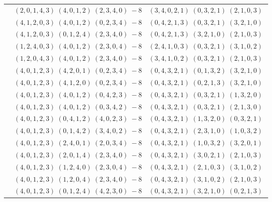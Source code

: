 \documentclass[11pt]{article}
\begin{document}
\begin{longtable}[l]{|c|c|c|}
 \cline{2-3} 
 & $(2 ,0 ,1 ,4 ,3) \;(4 ,0 ,1 ,2) \;(2 ,3 ,4 ,0) \;-8$ & $(3 ,4 ,0 ,2 ,1) \;(0 ,3 ,2 ,1) \;(2 ,1 ,0 ,3) \;$\\ 
 \cline{2-3} 
 & $(4 ,1 ,2 ,0 ,3) \;(4 ,0 ,1 ,2) \;(0 ,2 ,3 ,4) \;-8$ & $(0 ,4 ,2 ,1 ,3) \;(0 ,3 ,2 ,1) \;(3 ,2 ,1 ,0) \;$\\ 
 \cline{2-3} 
 & $(4 ,1 ,2 ,0 ,3) \;(0 ,1 ,2 ,4) \;(2 ,3 ,4 ,0) \;-8$ & $(0 ,4 ,2 ,1 ,3) \;(3 ,2 ,1 ,0) \;(2 ,1 ,0 ,3) \;$\\ 
 \cline{2-3} 
 & $(1 ,2 ,4 ,0 ,3) \;(4 ,0 ,1 ,2) \;(2 ,3 ,0 ,4) \;-8$ & $(2 ,4 ,1 ,0 ,3) \;(0 ,3 ,2 ,1) \;(3 ,1 ,0 ,2) \;$\\ 
 \cline{2-3} 
 & $(1 ,2 ,0 ,4 ,3) \;(4 ,0 ,1 ,2) \;(2 ,3 ,4 ,0) \;-8$ & $(3 ,4 ,1 ,0 ,2) \;(0 ,3 ,2 ,1) \;(2 ,1 ,0 ,3) \;$\\ 
 \cline{2-3} 
 & $(4 ,0 ,1 ,2 ,3) \;(4 ,2 ,0 ,1) \;(0 ,2 ,3 ,4) \;-8$ & $(0 ,4 ,3 ,2 ,1) \;(0 ,1 ,3 ,2) \;(3 ,2 ,1 ,0) \;$\\ 
 \cline{2-3} 
 & $(4 ,0 ,1 ,2 ,3) \;(4 ,1 ,2 ,0) \;(0 ,2 ,3 ,4) \;-8$ & $(0 ,4 ,3 ,2 ,1) \;(0 ,2 ,1 ,3) \;(3 ,2 ,1 ,0) \;$\\ 
 \cline{2-3} 
 & $(4 ,0 ,1 ,2 ,3) \;(4 ,0 ,1 ,2) \;(0 ,4 ,2 ,3) \;-8$ & $(0 ,4 ,3 ,2 ,1) \;(0 ,3 ,2 ,1) \;(1 ,3 ,2 ,0) \;$\\ 
 \cline{2-3} 
 & $(4 ,0 ,1 ,2 ,3) \;(4 ,0 ,1 ,2) \;(0 ,3 ,4 ,2) \;-8$ & $(0 ,4 ,3 ,2 ,1) \;(0 ,3 ,2 ,1) \;(2 ,1 ,3 ,0) \;$\\ 
 \cline{2-3} 
 & $(4 ,0 ,1 ,2 ,3) \;(0 ,4 ,1 ,2) \;(4 ,0 ,2 ,3) \;-8$ & $(0 ,4 ,3 ,2 ,1) \;(1 ,3 ,2 ,0) \;(0 ,3 ,2 ,1) \;$\\ 
 \cline{2-3} 
 & $(4 ,0 ,1 ,2 ,3) \;(0 ,1 ,4 ,2) \;(3 ,4 ,0 ,2) \;-8$ & $(0 ,4 ,3 ,2 ,1) \;(2 ,3 ,1 ,0) \;(1 ,0 ,3 ,2) \;$\\ 
 \cline{2-3} 
 & $(4 ,0 ,1 ,2 ,3) \;(2 ,4 ,0 ,1) \;(2 ,0 ,3 ,4) \;-8$ & $(0 ,4 ,3 ,2 ,1) \;(1 ,0 ,3 ,2) \;(3 ,2 ,0 ,1) \;$\\ 
 \cline{2-3} 
 & $(4 ,0 ,1 ,2 ,3) \;(2 ,0 ,1 ,4) \;(2 ,3 ,4 ,0) \;-8$ & $(0 ,4 ,3 ,2 ,1) \;(3 ,0 ,2 ,1) \;(2 ,1 ,0 ,3) \;$\\ 
 \cline{2-3} 
 & $(4 ,0 ,1 ,2 ,3) \;(1 ,2 ,4 ,0) \;(2 ,3 ,0 ,4) \;-8$ & $(0 ,4 ,3 ,2 ,1) \;(2 ,1 ,0 ,3) \;(3 ,1 ,0 ,2) \;$\\ 
 \cline{2-3} 
 & $(4 ,0 ,1 ,2 ,3) \;(1 ,2 ,0 ,4) \;(2 ,3 ,4 ,0) \;-8$ & $(0 ,4 ,3 ,2 ,1) \;(3 ,1 ,0 ,2) \;(2 ,1 ,0 ,3) \;$\\ 
 \cline{2-3} 
 & $(4 ,0 ,1 ,2 ,3) \;(0 ,1 ,2 ,4) \;(4 ,2 ,3 ,0) \;-8$ & $(0 ,4 ,3 ,2 ,1) \;(3 ,2 ,1 ,0) \;(0 ,2 ,1 ,3) \;$\\ 

\end{longtable}
\end{document}
